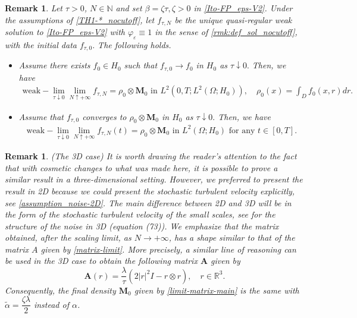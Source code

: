 \documentclass[a4paper,12pt, reqno]{amsart}
\newtheorem{remark}[theorem]{Remark}
\begin{document}
  {\begin{remark}
  Let $\tau>0$,	 $N\in   \mathbb{N}$ and  set  $\beta=\zeta \tau, \zeta>0$	   in  \eqref{Ito-FP_eps-V2}.           Under the assumptions of  \autoref{TH1-*_nocutoff}, let   $f_{\tau,N}$ be the unique quasi-regular weak solution to  \eqref{Ito-FP_eps-V2} with $\varphi_\varepsilon\equiv 1$ in the sense of  \autoref{rmk:def_sol_nocutoff}, with the initial data $f_{\tau,0}.$
The following holds.
\begin{itemize}
    \item   Assume there exists $f_0\in H_0$ such that   $f_{\tau, 0} \to f_0$ in $H_0$ as $\tau \downarrow 0.$ Then, we have
    \begin{align*}
    \displaystyle \text{weak}-\lim_{\tau\downarrow 0}\lim_{N\uparrow +\infty}   f_{\tau,N}= \rho_{0}\otimes\mathbf{M}_0 \text{ in } L^2(0,T;L^2(\Omega;H_0)), \quad \rho_0(x)=\int_D f_0(x,r) dr.
    \end{align*}
 \item     Assume that $f_{\tau,0}$ converges to $ \rho_{0}\otimes\mathbf{M}_0$ in $H_0$ as $\tau \downarrow 0.$ Then,  we have
      \begin{align*}
    \displaystyle \text{weak}-\lim_{\tau\downarrow 0}\lim_{N\uparrow +\infty}   f_{\tau,N}(t)= \rho_{0}\otimes\mathbf{M}_0 \text{ in } L^2(\Omega;H_0) \text{ for any } t\in [0,T].
    \end{align*}
\end{itemize} 
  \end{remark}}
\begin{remark}(The 3D case)
   It is worth drawing the reader's attention to the fact that with cosmetic changes to what was made here, it is possible to prove a similar result in a three-dimensional setting.  However, we preferred to present the result in 2D because we could present the stochastic turbulent velocity explicitly, see \autoref{assumption_noise-2D}. The main difference between 2D and 3D will be in the form of the stochastic turbulent velocity of the small scales,   see \cite[Subsection 7.4]{Flandoli-Tahraoui} for the structure of the noise in 3D (equation (73)). We emphasize that the matrix obtained, after the scaling limit, as $N\to +\infty$, has a shape similar to that of the matrix  $A$ given by \eqref{matrix-limit}. More precisely, a similar line of reasoning can be used in the 3D case to obtain the following matrix $\mathbf{A}$ given by 
   $$\mathbf{A}(r)= \dfrac{\lambda}{\tau}\left(2\lvert r\rvert^2 I-r\otimes r\right), \quad r\in \mathbb{R}^3.$$ Consequently, the final density $\mathbf{M}_0$  given by \eqref{limit-matrix-main} is the same with 
   $\widetilde{\alpha}=\dfrac{\zeta\lambda}{2}$ instead of $\alpha$.
 
\end{remark}
\end{document}
